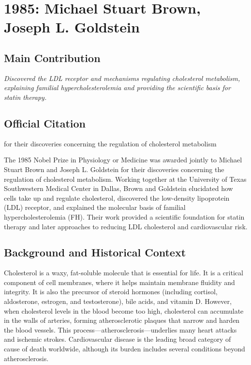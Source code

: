 \chapter[1985 --- Brown et al.]{1985: Michael Stuart Brown, Joseph L. Goldstein}
\label{ch:1985_Brown}

\section*{Main Contribution}

\textit{Discovered the LDL receptor and mechanisms regulating cholesterol metabolism, explaining familial hypercholesterolemia and providing the scientific basis for statin therapy.}\cite{nobel-1985,lecture-1985,lecture-goldstein-1985}

\section{Official Citation}

for their discoveries concerning the regulation of cholesterol metabolism

The 1985 Nobel Prize in Physiology or Medicine was awarded jointly to Michael Stuart Brown and Joseph L. Goldstein for their discoveries concerning the regulation of cholesterol metabolism. Working together at the University of Texas Southwestern Medical Center in Dallas, Brown and Goldstein elucidated how cells take up and regulate cholesterol, discovered the low-density lipoprotein (LDL) receptor, and explained the molecular basis of familial hypercholesterolemia (FH). Their work provided a scientific foundation for statin therapy and later approaches to reducing LDL cholesterol and cardiovascular risk.

\section{Background and Historical Context}

Cholesterol is a waxy, fat-soluble molecule that is essential for life. It is a critical component of cell membranes, where it helps maintain membrane fluidity and integrity. It is also the precursor of steroid hormones (including cortisol, aldosterone, estrogen, and testosterone), bile acids, and vitamin D. However, when cholesterol levels in the blood become too high, cholesterol can accumulate in the walls of arteries, forming atherosclerotic plaques that narrow and harden the blood vessels. This process---atherosclerosis---underlies many heart attacks and ischemic strokes. Cardiovascular disease is the leading broad category of cause of death worldwide, although its burden includes several conditions beyond atherosclerosis.

